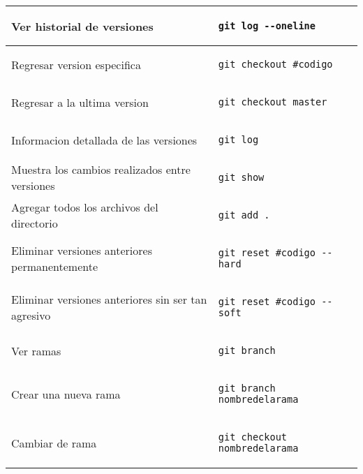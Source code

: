 \documentclass[landscape]{article}
\begin{document}
\begin{table}[ht]
\begin{center}
\begin{tabular}{| l | l |}
Ver historial de versiones &
\begin{lstlisting}
git log --oneline
\end{lstlisting}\\ \hline

Regresar version especifica &
\begin{lstlisting}
git checkout #codigo
\end{lstlisting}\\ \hline

Regresar a la ultima version &
\begin{lstlisting}
git checkout master
\end{lstlisting}\\ \hline

Informacion detallada de las versiones &
\begin{lstlisting}
git log
\end{lstlisting}\\ \hline

Muestra los cambios realizados entre versiones &
\begin{lstlisting}
git show
\end{lstlisting}\\ \hline

Agregar todos los archivos del directorio &
\begin{lstlisting}
git add .
\end{lstlisting}\\ \hline

Eliminar versiones anteriores permanentemente &
\begin{lstlisting}
git reset #codigo --hard
\end{lstlisting}\\ \hline

Eliminar versiones anteriores sin ser tan agresivo &
\begin{lstlisting}
git reset #codigo --soft
\end{lstlisting}\\ \hline

Ver ramas &
\begin{lstlisting}
git branch
\end{lstlisting}\\ \hline

Crear una nueva rama &
\begin{lstlisting}
git branch nombredelarama
\end{lstlisting}\\ \hline

Cambiar de rama &
\begin{lstlisting}
git checkout nombredelarama
\end{lstlisting}\\ \hline


\end{tabular}
\end{center}
\end{table}
\end{document}
